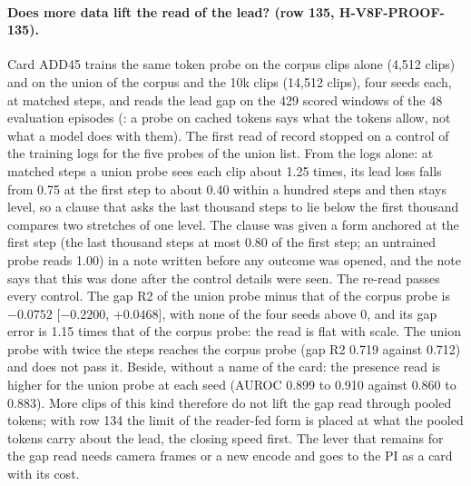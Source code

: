 
\paragraph{Does more data lift the read of the lead? (row 135, H-V8F-PROOF-135).} Card ADD45 trains the same token probe on the corpus clips alone (4,512 clips) and on the union of the corpus and the 10k clips (14,512 clips), four seeds each, at matched steps, and reads the lead gap on the 429 scored windows of the 48 evaluation episodes (: a probe on cached tokens says what the tokens allow, not what a model does with them). The first read of record stopped on a control of the training logs for the five probes of the union list. From the logs alone: at matched steps a union probe sees each clip about 1.25 times, its lead loss falls from 0.75 at the first step to about 0.40 within a hundred steps and then stays level, so a clause that asks the last thousand steps to lie below the first thousand compares two stretches of one level. The clause was given a form anchored at the first step (the last thousand steps at most 0.80 of the first step; an untrained probe reads 1.00) in a note written before any outcome was opened, and the note says that this was done after the control details were seen. The re-read passes every control. The gap R2 of the union probe minus that of the corpus probe is $-0.0752$ [$-0.2200$, $+0.0468$], with none of the four seeds above 0, and its gap error is 1.15 times that of the corpus probe: the read is flat with scale. The union probe with twice the steps reaches the corpus probe (gap R2 0.719 against 0.712) and does not pass it. Beside, without a name of the card: the presence read is higher for the union probe at each seed (AUROC 0.899 to 0.910 against 0.860 to 0.883). More clips of this kind therefore do not lift the gap read through pooled tokens; with row 134 the limit of the reader-fed form is placed at what the pooled tokens carry about the lead, the closing speed first. The lever that remains for the gap read needs camera frames or a new encode and goes to the PI as a card with its cost.
